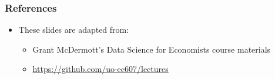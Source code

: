 \documentclass[10pt]{beamer}
\begin{document}
\begin{frame}
    \frametitle{References}

    \begin{itemize}
        \item These slides are adapted from:
        \begin{itemize}
            \item Grant McDermott's Data Science for Economists course materials
            \item \url{https://github.com/uo-ec607/lectures}
        \end{itemize}
    \end{itemize}
\end{frame}
\end{document}
